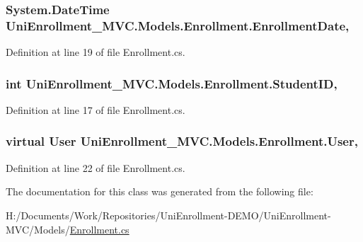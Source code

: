 \subsubsection[{\texorpdfstring{Enrollment\+Date}{EnrollmentDate}}]{\setlength{\rightskip}{0pt plus 5cm}System.\+Date\+Time Uni\+Enrollment\+\_\+\+M\+V\+C.\+Models.\+Enrollment.\+Enrollment\+Date\hspace{0.3cm}{\ttfamily [get]}, {\ttfamily [set]}}\hypertarget{class_uni_enrollment___m_v_c_1_1_models_1_1_enrollment_a717b740b6f699a2742dc5ff98aeea11f}{}\label{class_uni_enrollment___m_v_c_1_1_models_1_1_enrollment_a717b740b6f699a2742dc5ff98aeea11f}


Definition at line 19 of file Enrollment.\+cs.

\subsubsection[{\texorpdfstring{Student\+ID}{StudentID}}]{\setlength{\rightskip}{0pt plus 5cm}int Uni\+Enrollment\+\_\+\+M\+V\+C.\+Models.\+Enrollment.\+Student\+ID\hspace{0.3cm}{\ttfamily [get]}, {\ttfamily [set]}}\hypertarget{class_uni_enrollment___m_v_c_1_1_models_1_1_enrollment_a94c4c7411d5e49898f1f9e8534a05d07}{}\label{class_uni_enrollment___m_v_c_1_1_models_1_1_enrollment_a94c4c7411d5e49898f1f9e8534a05d07}


Definition at line 17 of file Enrollment.\+cs.

\subsubsection[{\texorpdfstring{User}{User}}]{\setlength{\rightskip}{0pt plus 5cm}virtual {\bf User} Uni\+Enrollment\+\_\+\+M\+V\+C.\+Models.\+Enrollment.\+User\hspace{0.3cm}{\ttfamily [get]}, {\ttfamily [set]}}\hypertarget{class_uni_enrollment___m_v_c_1_1_models_1_1_enrollment_a74c6ec4f394b98e2d676f97847a255fd}{}\label{class_uni_enrollment___m_v_c_1_1_models_1_1_enrollment_a74c6ec4f394b98e2d676f97847a255fd}


Definition at line 22 of file Enrollment.\+cs.



The documentation for this class was generated from the following file\+:\begin{DoxyCompactItemize}
\item 
H\+:/\+Documents/\+Work/\+Repositories/\+Uni\+Enrollment-\/\+D\+E\+M\+O/\+Uni\+Enrollment-\/\+M\+V\+C/\+Models/\hyperlink{_enrollment_8cs}{Enrollment.\+cs}\end{DoxyCompactItemize}
